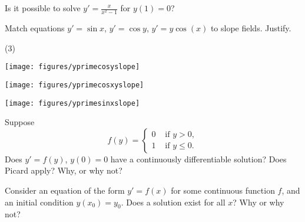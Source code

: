 \begin{exercise}
Is it possible to solve $y' = \frac{x}{x^2-1}$ for $y(1) = 0$?
\end{exercise}

\begin{samepage}
\begin{exercise}
Match equations $y'=\sin x$, $y'=\cos y$, $y' = y\cos(x)$ to slope fields.
Justify.
\begin{tasks}(3)
\task
\parbox[c]{1.75in}{\texttt{[image: figures/yprimecosyslope]}}
\task
\parbox[c]{1.75in}{\texttt{[image: figures/yprimecosxyslope]}}
\task
\parbox[c]{1.75in}{\texttt{[image: figures/yprimesinxslope]}}
\end{tasks}
\end{exercise}
\end{samepage}

\begin{exercise}[tricky]
Suppose
\begin{equation*}
f(y) =
\begin{cases}
0 & \text{ if $y > 0$}, \\
1 & \text{ if $y \leq 0$} .
\end{cases}
\end{equation*}
Does $y' = f(y)$, $y(0) = 0$ have a continuously differentiable solution?  Does Picard apply?  Why, or why not?
\end{exercise}

\begin{exercise}
Consider an equation of the form $y' = f(x)$ for some continuous function
$f$, and an initial condition $y(x_0) = y_0$.  Does a
solution exist for all $x$?  Why or why not?
\end{exercise}


